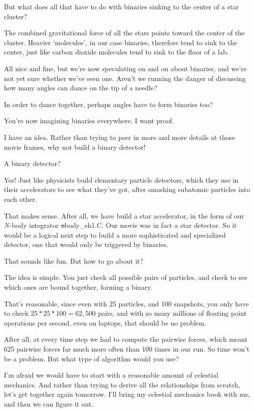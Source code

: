 \bob
But what does all that have to do with binaries sinking to the center
of a star cluster?

\alice
The combined gravitational force of all the stars points toward the
center of the cluster.  Heavier `molecules', in our case binaries,
therefore tend to sink to the center, just like carbon dioxide
molecules tend to sink to the floor of a lab.

\carol
All nice and fine, but we're now speculating on and on about binaries,
and we're not yet sure whether we've seen one.  Aren't we running the
danger of discussing how many angles can dance on the tip of a needle?

\bob
In order to dance together, perhaps angles have to form binaries too?

\carol
You're now imagining binaries everywhere.  I want proof.

\alice
I have an idea.  Rather than trying to peer in more and more details
at those movie frames, why not build a binary detector!

\bob
A binary detector?

\alice
Yes!  Just like physicists build elementary particle detectors,
which they use in their accelerators to see what they've got, after
smashing subatomic particles into each other.

\bob
That makes sense.  After all, we have build a star accelerator, in the
form of our $N$-body integrator {\st nbody\_sh1.C}.  Our movie was in
fact a star detector.  So it would be a logical next step to build a
more sophisticated and specialized detector, one that would only be
triggered by binaries.

\carol
That sounds like fun.  But how to go about it?

\alice
The idea is simple.  You just check all possible pairs of particles,
and check to see which ones are bound together, forming a binary.

\carol
That's reasonable, since even with 25 particles, and 100 snapshots,
you only have to check $25*25*100 = 62,500$ pairs, and with so many
millions of floating point operations per second, even on laptops,
that should be no problem.

\bob
After all, at every time step we had to compute the pairwise forces,
which meant 625 pairwise forces far much more often than 100 times in
our run.  So time won't be a problem.  But what type of algorithm
would you use?

\alice
I'm afraid we would have to start with a reasonable amount of
celestial mechanics.  And rather than trying to derive all the
relationships from scratch, let's get together again tomorrow.
I'll bring my celestial mechanics book with me, and then we can
figure it out.

\cba


